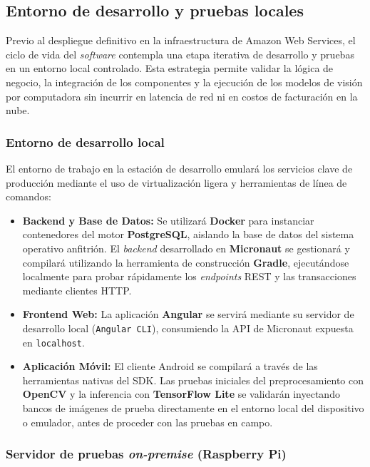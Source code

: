 \subsection{Entorno de desarrollo y pruebas locales}

Previo al despliegue definitivo en la infraestructura de Amazon Web Services, el ciclo de vida del \textit{software} contempla una etapa iterativa de desarrollo y pruebas en un entorno local controlado. Esta estrategia permite validar la lógica de negocio, la integración de los componentes y la ejecución de los modelos de visión por computadora sin incurrir en latencia de red ni en costos de facturación en la nube.

\subsubsection{Entorno de desarrollo local}

El entorno de trabajo en la estación de desarrollo emulará los servicios clave de producción mediante el uso de virtualización ligera y herramientas de línea de comandos:

\begin{itemize}
    \item \textbf{Backend y Base de Datos:} Se utilizará \textbf{Docker} para instanciar contenedores del motor \textbf{PostgreSQL}, aislando la base de datos del sistema operativo anfitrión. El \textit{backend} desarrollado en \textbf{Micronaut} se gestionará y compilará utilizando la herramienta de construcción \textbf{Gradle}, ejecutándose localmente para probar rápidamente los \textit{endpoints} REST y las transacciones mediante clientes HTTP.
    \item \textbf{Frontend Web:} La aplicación \textbf{Angular} se servirá mediante su servidor de desarrollo local (\texttt{Angular CLI}), consumiendo la API de Micronaut expuesta en \texttt{localhost}.
    \item \textbf{Aplicación Móvil:} El cliente Android se compilará a través de las herramientas nativas del SDK. Las pruebas iniciales del preprocesamiento con \textbf{OpenCV} y la inferencia con \textbf{TensorFlow Lite} se validarán inyectando bancos de imágenes de prueba directamente en el entorno local del dispositivo o emulador, antes de proceder con las pruebas en campo.
\end{itemize}

\subsubsection{Servidor de pruebas \textit{on-premise} (Raspberry Pi)}

